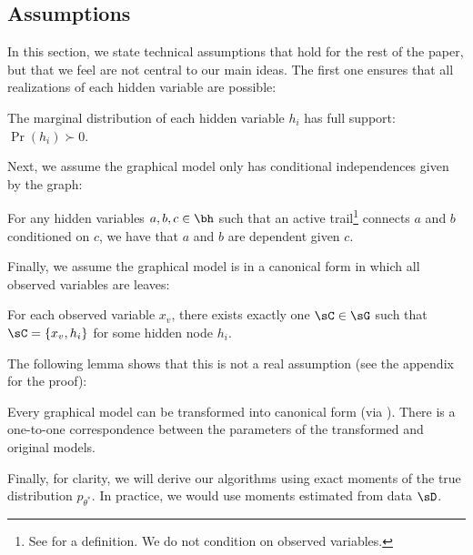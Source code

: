 \subsection{Assumptions}

In this section, we state technical assumptions that hold for the rest of the
paper, but that we feel are not central to our main ideas.
The first one ensures that all realizations of each hidden variable are possible:

\begin{assumption}
  \label{asm:non-degeneracy}
  The marginal distribution of each hidden variable $h_i$ has full support: $\Pr(h_i) \succ 0$.
\end{assumption}

Next, we assume the graphical model only has conditional independences given by
the graph:
\begin{assumption}[Faithful]
  \label{asm:faithful}  
  For any hidden variables $a,b,c \in \bh$
  such that an active trail\footnote{See
  \citet{koller2009probabilistic} for a definition.
  We do not condition on observed variables.} connects $a$ and $b$ conditioned on $c$,
  we have that $a$ and $b$ are dependent given $c$. %
\end{assumption}

Finally, we assume the graphical model is in a canonical form
in which all observed variables are leaves:
\begin{assumption}
  \label{asm:canonical}
  For each observed variable $x_v$, there exists exactly one $\sC \in \sG$
  such that $\sC = \{ x_v, h_{i} \}$ for some hidden node $h_{i}$.
\end{assumption}
The following lemma shows that this is not a real assumption (see the appendix for the proof):
\begin{lemma}
\label{lem:reduction}
Every graphical model can be transformed into canonical
form (via ).
There is a one-to-one correspondence between the parameters of the transformed
and original models.
\end{lemma}

Finally, for clarity, we will derive our algorithms using exact moments of the true
distribution $p_{\theta^*}$.  In practice, we would use moments estimated from data $\sD$.

